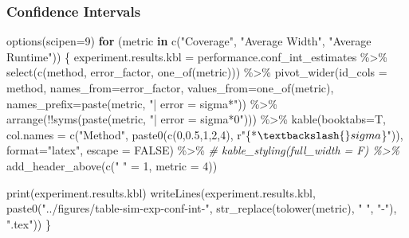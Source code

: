 \documentclass[
]{article}
\newenvironment{Shaded}{\begin{snugshade}}{\end{snugshade}}
\newcommand{\AttributeTok}[1]{\textcolor[rgb]{0.77,0.63,0.00}{#1}}
\newcommand{\CommentTok}[1]{\textcolor[rgb]{0.56,0.35,0.01}{\textit{#1}}}
\newcommand{\ConstantTok}[1]{\textcolor[rgb]{0.00,0.00,0.00}{#1}}
\newcommand{\ControlFlowTok}[1]{\textcolor[rgb]{0.13,0.29,0.53}{\textbf{#1}}}
\newcommand{\DecValTok}[1]{\textcolor[rgb]{0.00,0.00,0.81}{#1}}
\newcommand{\FloatTok}[1]{\textcolor[rgb]{0.00,0.00,0.81}{#1}}
\newcommand{\FunctionTok}[1]{\textcolor[rgb]{0.00,0.00,0.00}{#1}}
\newcommand{\NormalTok}[1]{#1}
\newcommand{\OtherTok}[1]{\textcolor[rgb]{0.56,0.35,0.01}{#1}}
\newcommand{\SpecialCharTok}[1]{\textcolor[rgb]{0.00,0.00,0.00}{#1}}
\newcommand{\StringTok}[1]{\textcolor[rgb]{0.31,0.60,0.02}{#1}}
\begin{document}
\hypertarget{confidence-intervals}{%
\subsubsection{Confidence Intervals}\label{confidence-intervals}}

\begin{Shaded}
\begin{Highlighting}[]
\FunctionTok{options}\NormalTok{(}\AttributeTok{scipen=}\DecValTok{9}\NormalTok{)}
\ControlFlowTok{for}\NormalTok{ (metric }\ControlFlowTok{in} \FunctionTok{c}\NormalTok{(}\StringTok{"Coverage"}\NormalTok{, }\StringTok{"Average Width"}\NormalTok{, }\StringTok{"Average Runtime"}\NormalTok{)) \{}
\NormalTok{  experiment.results.kbl }\OtherTok{=}\NormalTok{ performance.conf\_int\_estimates }\SpecialCharTok{\%\textgreater{}\%}
    \FunctionTok{select}\NormalTok{(}\FunctionTok{c}\NormalTok{(method, error\_factor, }\FunctionTok{one\_of}\NormalTok{(metric))) }\SpecialCharTok{\%\textgreater{}\%}
    \FunctionTok{pivot\_wider}\NormalTok{(}\AttributeTok{id\_cols =}\NormalTok{ method,}
              \AttributeTok{names\_from=}\NormalTok{error\_factor,}
              \AttributeTok{values\_from=}\FunctionTok{one\_of}\NormalTok{(metric),}
              \AttributeTok{names\_prefix=}\FunctionTok{paste}\NormalTok{(metric, }\StringTok{"| error = sigma*"}\NormalTok{)) }\SpecialCharTok{\%\textgreater{}\%}
    \FunctionTok{arrange}\NormalTok{(}\SpecialCharTok{!!}\FunctionTok{syms}\NormalTok{(}\FunctionTok{paste}\NormalTok{(metric, }\StringTok{"| error = sigma*0"}\NormalTok{))) }\SpecialCharTok{\%\textgreater{}\%}
    \FunctionTok{kable}\NormalTok{(}\AttributeTok{booktabs=}\NormalTok{T, }\AttributeTok{col.names =} \FunctionTok{c}\NormalTok{(}\StringTok{"Method"}\NormalTok{, }\FunctionTok{paste0}\NormalTok{(}\FunctionTok{c}\NormalTok{(}\DecValTok{0}\NormalTok{,}\FloatTok{0.5}\NormalTok{,}\DecValTok{1}\NormalTok{,}\DecValTok{2}\NormalTok{,}\DecValTok{4}\NormalTok{), r}\StringTok{"\{*$\textbackslash{}sigma$\}"}\NormalTok{)), }\AttributeTok{format=}\StringTok{"latex"}\NormalTok{, }\AttributeTok{escape =} \ConstantTok{FALSE}\NormalTok{) }\SpecialCharTok{\%\textgreater{}\%}
    \CommentTok{\# kable\_styling(full\_width = F) \%\textgreater{}\%}
    \FunctionTok{add\_header\_above}\NormalTok{(}\FunctionTok{c}\NormalTok{(}\StringTok{" "} \OtherTok{=} \DecValTok{1}\NormalTok{, }\AttributeTok{metric =} \DecValTok{4}\NormalTok{))}
  
  \FunctionTok{print}\NormalTok{(experiment.results.kbl)}
  \FunctionTok{writeLines}\NormalTok{(experiment.results.kbl, }\FunctionTok{paste0}\NormalTok{(}\StringTok{"../figures/table{-}sim{-}exp{-}conf{-}int{-}"}\NormalTok{, }\FunctionTok{str\_replace}\NormalTok{(}\FunctionTok{tolower}\NormalTok{(metric), }\StringTok{" "}\NormalTok{, }\StringTok{"{-}"}\NormalTok{), }\StringTok{".tex"}\NormalTok{))}
\NormalTok{\}}
\end{Highlighting}
\end{Shaded}
\end{document}
